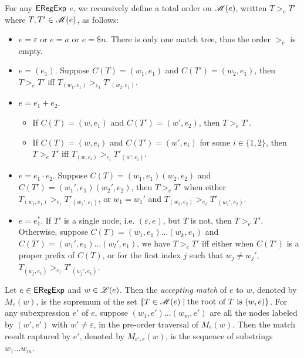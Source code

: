   \begin{definition}\label{def-regex-semantics}
  		
  	For any ${\sf ERegExp}$ $e$, we recursively define a total order on $\mathscr{M}(e)$, written $T
  	>_e T'$ where $T, T' \in \mathscr{M}(e)$, as follows:
  	\begin{itemize}
  		\item $e = \varepsilon$ or $e = a$ or $e = \$ n$. There is only one match tree, thus the
  		order $>_e$ is empty.
  		
  		\item $e = (e_1)$. Suppose $C (T) = (w_1, e_1)$ and $C (T') = (w_2, e_1)$,
  		then $T >_e T'$ iff $T_{(w_1, e_1)} >_{e_1} T'_{(w_2, e_1)}$.
  		
  		\item $e = e_1 + e_2$.
  		\begin{itemize}
  			\item If $C (T) = (w, e_1)$ and $C (T') = (w', e_2)$, then $T >_e T'$.
  			
  			\item If $C (T) = (w, e_i)$ and $C (T') = (w', e_i)$ for some $i \in \{ 1,
  			2 \}$, then $T >_e T'$ iff $T_{(w, e_i)} >_{e_i} T'_{(w', e_i)}$.
  		\end{itemize}
  		\item $e = e_1 \cdot e_2$. Suppose $C (T) = (w_1, e_1) (w_2, e_2)$ and $C (T') =
  		(w_1', e_1) (w_2', e_2)$, then $T >_e T'$ when either $T_{(w_1, e_1)} >_{e_1}
  		T'_{(w_1', e_1)}$, or $w_1 = w_1'$ and $T_{(w_2, e_2)} >_{e_2} T'_{(w_2', e_2)}$.
  		
  		\item $e = e_1^{\ast}$. If $T' $ is  a single node, i.e. $(\varepsilon, e)$, but $T$ is not, then $T >_e T'$.
  		Otherwise, suppose $C(T) = (w_1, e_1) \ldots (w_k, e_1)$ and $C (T') =
  		(w_1', e_1) \ldots (w_l', e_1)$, we have $T >_e T'$ iff either when $C (T')$
  		is a proper prefix of $C (T)$, or for the first index $j$ such that $w_j
  		\neq w_j'$, $T_{(w_j, e_1)} >_{e_1} T'_{(w_j', e_1)}$.
  	\end{itemize}
  	
  	Let $e \in {\sf ERegExp}$ and $w \in \mathscr{L}(e)$. Then the \emph{accepting match} of $e$ to $w$, denoted by $M_e(w)$, is the supremum of the set $\{ T \in \mathscr{M}(e) \mid \mbox{the root of } T \mbox{ is } (w, e) \}$.
%  	
  	For any subexpression $e'$ of $e$, suppose $(w_1, e') \ldots (w_m, e')$ are
  	all the nodes labeled by $(w', e')$ with $w' \neq \varepsilon$, in the
  	pre-order traversal of $M_e(w)$. Then the match result captured by $e'$, denoted
  	by $M_{e', e} (w)$, is the sequence of substrings $w_1 \ldots w_m$.
  \end{definition}

